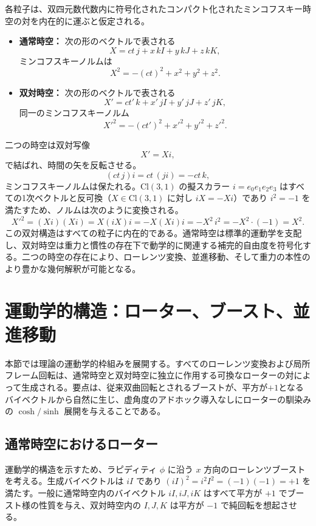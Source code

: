 \documentclass[a4paper]{article}
\begin{document}
各粒子は、双四元数代数内に符号化されたコンパクト化されたミンコフスキー時空の対を内在的に運ぶと仮定される。
\begin{itemize}
  \item \textbf{通常時空：} 次の形のベクトルで表される
  \[
  X = ct \, j + x \, kI + y \, kJ + z \, kK,
  \]
  ミンコフスキーノルムは
  \[
  X^2 = -(ct)^2 + x^2 + y^2 + z^2.
  \]

  \item \textbf{双対時空：} 次の形のベクトルで表される
  \[
  X' = ct' \, k + x' \, jI + y' \, jJ + z' \, jK,
  \]
  同一のミンコフスキーノルム
  \[
  X'^2 = -(ct')^2 + x'^2 + y'^2 + z'^2.
  \]
\end{itemize}
二つの時空は双対写像
\[
X' = X i,
\]
で結ばれ、時間の矢を反転させる。
\[
(ct \, j) i = ct \, (j i) = -ct \, k,
\]
ミンコフスキーノルムは保たれる。$\mathrm{Cl}(3,1)$ の擬スカラー $i = e_0 e_1 e_2 e_3$ はすべての1次ベクトルと反可換（$X \in \mathrm{Cl}(3,1)$ に対し $i X = -X i$）であり $i^2 = -1$ を満たすため、ノルムは次のように変換される。
\[
X'^2 = (X i)(X i) = X (i X) i = -X (X i) i = -X^2\, i^2 = -X^2 \cdot (-1) = X^2.
\]
この双対構造はすべての粒子に内在的である。通常時空は標準的運動学を支配し、双対時空は重力と慣性の存在下で動学的に関連する補完的自由度を符号化する。二つの時空の存在により、ローレンツ変換、並進移動、そして重力の本性のより豊かな幾何解釈が可能となる。

\section{運動学的構造：ローター、ブースト、並進移動}
\label{sec:kinematics}

本節では理論の運動学的枠組みを展開する。すべてのローレンツ変換および局所フレーム回転は、通常時空と双対時空に独立に作用する可換なローターの対によって生成される。要点は、従来双曲回転とされるブーストが、平方が$+1$となるバイベクトルから自然に生じ、虚角度のアドホック導入なしにローターの馴染みの $\cosh/\sinh$ 展開を与えることである。

\subsection{通常時空におけるローター}

運動学的構造を示すため、ラピディティ $\phi$ に沿う $x$ 方向のローレンツブーストを考える。生成バイベクトルは $iI$ であり $(iI)^2 = i^2 I^2 = (-1)(-1) = +1$ を満たす。一般に通常時空内のバイベクトル $iI,iJ,iK$ はすべて平方が $+1$ でブースト様の性質を与え、双対時空内の $I,J,K$ は平方が $-1$ で純回転を想起させる。
\end{document}
